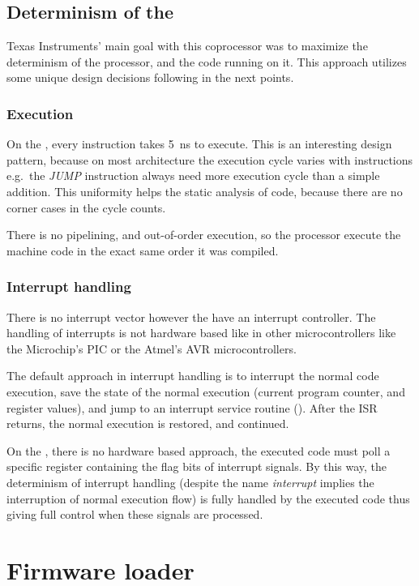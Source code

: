 \subsection{Determinism of the \pru}

Texas Instruments' main goal with this coprocessor was to maximize the determinism of the processor, and the code running on it. This approach utilizes some unique design decisions following in the next points.

\subsubsection{Execution}

On the \pru, every instruction takes \qty{5}{\nano\second} to execute. This is an interesting design pattern, because on most architecture the execution cycle varies with instructions e.g.\ the \emph{JUMP} instruction always need more execution cycle than a simple addition. This uniformity helps the static analysis of code, because there are no corner cases in the cycle counts.

There is no pipelining, and out-of-order execution, so the processor execute the machine code in the exact same order it was compiled.

\subsubsection{Interrupt handling}

There is no interrupt vector however the \pruss{} have an interrupt controller. The handling of interrupts is not hardware based like in other microcontrollers like the Microchip's PIC or the Atmel's AVR microcontrollers.

The default approach in interrupt handling is to interrupt the normal code execution, save the state of the normal execution (current program counter, and register values), and jump to an interrupt service routine (). After the ISR returns, the normal execution is restored, and continued.

On the \pru{}, there is no hardware based approach, the executed code must poll a specific register containing the flag bits of interrupt signals. By this way, the determinism of interrupt handling (despite the name \emph{interrupt} implies the interruption of normal execution flow) is fully handled by the executed code thus giving full control when these signals are processed.

\section{Firmware loader}

